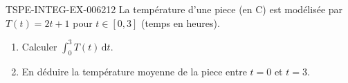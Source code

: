 \begin{exercice}{TSPE-INTEG-EX-006}{2}{12}
La température d'une piece (en \degres C) est modélisée par $T(t) = 2t+1$ pour $t \in [0,3]$ (temps en heures).
\begin{enumerate}
  \item Calculer $\displaystyle\int_0^3 T(t)\,\mathrm{d}t$.
  \item En déduire la température moyenne de la piece entre $t=0$ et $t=3$.
\end{enumerate}
\end{exercice}
